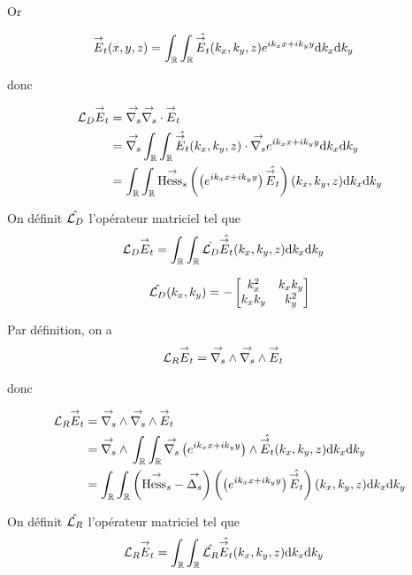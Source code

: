     Or

    \begin{align}
      \vE_t(x,y,z) & = \int_\RR\int_\RR \hat{\vE_t}(k_x,k_y,z)e^{ik_xx + ik_yy}\dd{k_x}\dd{k_y}
    \end{align}


    donc

    \begin{align}
      \LD \vE_t
      & = \vgrads{} \vdivs{} \vE_t
      \\
      &=\vgrads{} \int_\RR\int_\RR \hat{\vE_t}(k_x,k_y,z) \cdot \vgrads{} e^{ik_xx + ik_yy}\dd{k_x}\dd{k_y}
      \\
      &=\int_\RR \int_\RR \vhesss{}\left(\left( e^{ik_xx + ik_yy} \right) \hat{\vE_t}\right)(k_x,k_y,z)\dd{k_x}\dd{k_y}
    \end{align}

    On définit \(\hat{\LD}\) l'opérateur matriciel tel que
    \begin{align}
      \LD \vE_t
      &= \int_\RR\int_\RR \hat{\LD} \hat{\vE_t}(k_x,k_y,z)\dd{k_x}\dd{k_y}
    \end{align}

    \begin{equation}
      \hat{\LD}(k_x,k_y) = -
      \begin{bmatrix}
        k_x^2 & k_x k_y
        \\
        k_x k_y & k_y^2
      \end{bmatrix}
    \end{equation}


    Par définition, on a
    \begin{align}
      \LR \vE_t & = \vrots{} \vrots{} \vE_t
    \end{align}

    donc

    \begin{align}
      \LR \vE_t
      & = \vrots{} \vrots{} \vE_t
      \\
      &=\vrots{} \int_\RR\int_\RR \vgrads{}\left(e^{ik_xx + ik_yy}\right) \pvect \hat{\vE_t}(k_x,k_y,z)\dd{k_x}\dd{k_y}
      \\
      &= \int_\RR \int_\RR \left(\vhesss - \vlapls\right) \left(\left(e^{ik_xx + ik_yy}\right) \hat{\vE_t}\right)(k_x,k_y,z)\dd{k_x}\dd{k_y}
      \\
    \end{align}

    On définit \(\hat{\LR}\) l'opérateur matriciel tel que
    \begin{align}
      \LR \vE_t
      &= \int_\RR\int_\RR \hat{\LR} \hat{\vE_t}(k_x,k_y,z)\dd{k_x}\dd{k_y}
    \end{align}

